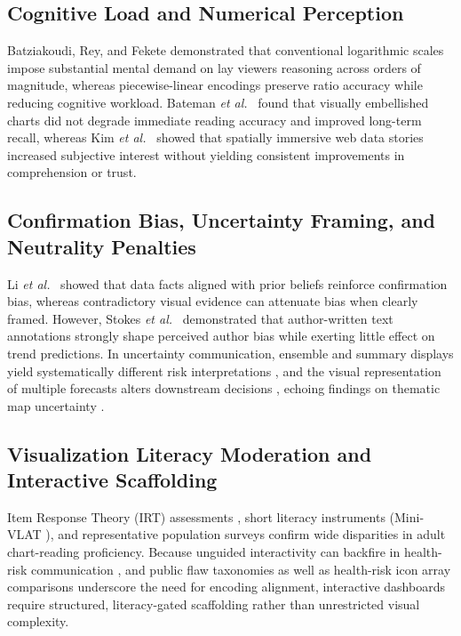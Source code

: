 \documentclass[conference]{IEEEtran}
\begin{document}
\subsection{Cognitive Load and Numerical Perception}
Batziakoudi, Rey, and Fekete \cite{batziakoudi2026} demonstrated that conventional logarithmic scales impose substantial mental demand on lay viewers reasoning across orders of magnitude, whereas piecewise-linear encodings preserve ratio accuracy while reducing cognitive workload. Bateman \textit{et al.}\ \cite{bateman2010} found that visually embellished charts did not degrade immediate reading accuracy and improved long-term recall, whereas Kim \textit{et al.}\ \cite{kim2024} showed that spatially immersive web data stories increased subjective interest without yielding consistent improvements in comprehension or trust.

\subsection{Confirmation Bias, Uncertainty Framing, and Neutrality Penalties}
Li \textit{et al.}\ \cite{li2025} showed that data facts aligned with prior beliefs reinforce confirmation bias, whereas contradictory visual evidence can attenuate bias when clearly framed. However, Stokes \textit{et al.}\ \cite{stokes2024} demonstrated that author-written text annotations strongly shape perceived author bias while exerting little effect on trend predictions. In uncertainty communication, ensemble and summary displays yield systematically different risk interpretations \cite{padilla2017}, and the visual representation of multiple forecasts alters downstream decisions \cite{sarma2025}, echoing findings on thematic map uncertainty \cite{srivastava2026}.

\subsection{Visualization Literacy Moderation and Interactive Scaffolding}
Item Response Theory (IRT) assessments \cite{cui2024}, short literacy instruments (Mini-VLAT \cite{pandey2023}), and representative population surveys \cite{saske2024} confirm wide disparities in adult chart-reading proficiency. Because unguided interactivity can backfire in health-risk communication \cite{zikmund2011}, and public flaw taxonomies \cite{lan2025} as well as health-risk icon array comparisons \cite{kandel2026} underscore the need for encoding alignment, interactive dashboards require structured, literacy-gated scaffolding rather than unrestricted visual complexity.
\end{document}
